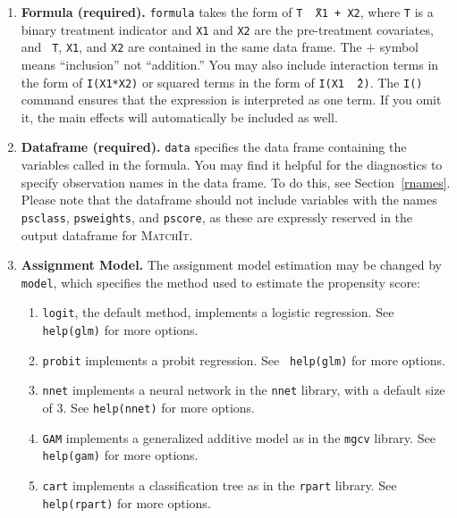 \documentclass[oneside,letterpaper,titlepage]{article}
\newcommand{\MatchIt}{\textsc{MatchIt}}
\begin{document}
\begin{enumerate}
  
\item \textbf{Formula (required).}  \texttt{formula} takes the form of
  {\tt T \~\ X1 + X2}, where {\tt T} is a binary treatment indicator
  and {\tt X1} and {\tt X2} are the pre-treatment covariates, and {\tt
    T}, {\tt X1}, and {\tt X2} are contained in the same data frame.
  The $+$ symbol means ``inclusion'' not ``addition.'' You may also
  include interaction terms in the form of {\tt I(X1*X2)} or squared
  terms in the form of {\tt I(X1 \^\ 2)}.  The \texttt{I()} command
  ensures that the expression is interpreted as one term.  If you omit
  it, the main effects will automatically be included as well.
  
\item \textbf{Dataframe (required).}  \texttt{data} specifies the data
  frame containing the variables called in the formula.  You may find
  it helpful for the diagnostics to specify observation names in the
  data frame.  To do this, see Section~\ref{rnames}.  Please note that
  the dataframe should not include variables with the names
  \texttt{psclass}, \texttt{psweights}, and \texttt{pscore}, as these
  are expressly reserved in the output dataframe for \MatchIt. 
  
\item \textbf{Assignment Model.}  The assignment model estimation may
  be changed by \texttt{model}, which specifies the method used to
  estimate the propensity score:
  \begin{enumerate}
  \item \texttt{logit}, the default method, implements a logistic
    regression.  See {\tt help(glm)} for more options.
  \item \texttt{probit} implements a probit regression.  See {\tt
      help(glm)} for more options.
  \item \texttt{nnet} implements a neural network in the \texttt{nnet}
    library, with a default size of 3.  See {\tt help(nnet)} for more
    options.
  \item \texttt{GAM} implements a generalized additive model as in the
    \texttt{mgcv} library.  See {\tt help(gam)} for more options.
  \item \texttt{cart} implements a classification tree as in the
    \texttt{rpart} library.  See {\tt help(rpart)} for more options.
  \end{enumerate}
  

\end{enumerate}
\end{document}
